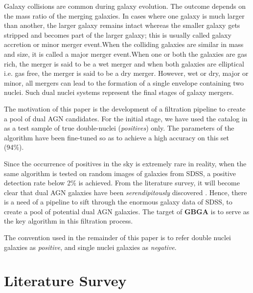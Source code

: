 \documentclass[12pt]{article}
\begin{document}
\bigskip

Galaxy collisions are common during galaxy evolution. The outcome depends on the mass
ratio of the merging galaxies. In cases where one galaxy is much larger than another, 
the larger galaxy remains intact whereas the smaller galaxy gets stripped and becomes 
part of the larger galaxy; this is usually called galaxy accretion or minor merger event.When the colliding galaxies are similar in mass and size, it is called a major merger event.When one or both the galaxies are gas rich, the merger is said to be a wet merger and when both galaxies are elliptical i.e. gas free, the merger is said to be a dry merger. However, wet or dry, major or minor, all mergers can lead to the formation of a single envelope containing two nuclei. Such dual nuclei systems represent the final stages of galaxy mergers.

\bigskip

The motivation of this paper is the development of a filtration pipeline to create a pool of dual AGN candidates. For the initial stage, we have used the catalog in  as a test sample of  true double-nuclei (\textit{positives}) only. The parameters of the algorithm have been fine-tuned so as to achieve a high accuracy on this set (94\%).

\bigskip

Since the occurrence of positives in the sky is extremely rare in reality, when the same algorithm is tested on random images of galaxies from SDSS, a positive detection rate below 2\% is achieved. From the literature survey, it will become clear that dual AGN galaxies have been \textit{serendipitously} discovered \cite{satypal} \cite{jinny}. Hence, there is a need of a pipeline to sift through the enormous galaxy data of SDSS, to create a pool of potential dual AGN galaxies. The target of \textbf{GBGA} is to serve as the key algorithm in this filtration process.

\bigskip

The convention used in the remainder of this paper is to refer double nuclei galaxies as \textit{positive}, and single nuclei galaxies as \textit{negative}.

\section{Literature Survey}	  
\end{document}
